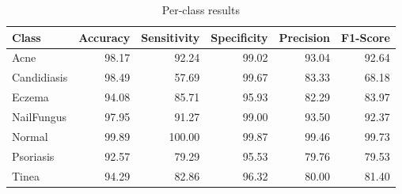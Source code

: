 \begin{table}
\caption{Per-class results}
\label{tab:results}
\begin{tabular}{lrrrrr}
\toprule
Class & Accuracy & Sensitivity & Specificity & Precision & F1-Score \\
\midrule
Acne & 98.17 & 92.24 & 99.02 & 93.04 & 92.64 \\
Candidiasis & 98.49 & 57.69 & 99.67 & 83.33 & 68.18 \\
Eczema & 94.08 & 85.71 & 95.93 & 82.29 & 83.97 \\
NailFungus & 97.95 & 91.27 & 99.00 & 93.50 & 92.37 \\
Normal & 99.89 & 100.00 & 99.87 & 99.46 & 99.73 \\
Psoriasis & 92.57 & 79.29 & 95.53 & 79.76 & 79.53 \\
Tinea & 94.29 & 82.86 & 96.32 & 80.00 & 81.40 \\
\bottomrule
\end{tabular}
\end{table}
